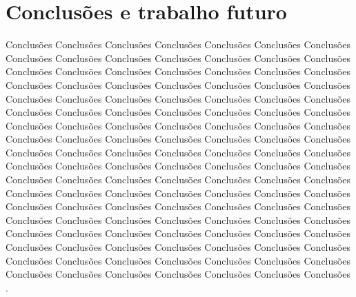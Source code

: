 \chapter{Conclusões e trabalho futuro}

Conclusões Conclusões Conclusões Conclusões Conclusões Conclusões
Conclusões
Conclusões Conclusões Conclusões Conclusões Conclusões Conclusões
Conclusões Conclusões Conclusões Conclusões Conclusões Conclusões
Conclusões Conclusões Conclusões Conclusões Conclusões Conclusões
Conclusões Conclusões Conclusões Conclusões Conclusões Conclusões
Conclusões Conclusões Conclusões Conclusões Conclusões Conclusões
Conclusões Conclusões Conclusões Conclusões Conclusões Conclusões
Conclusões Conclusões Conclusões Conclusões Conclusões Conclusões
Conclusões Conclusões Conclusões Conclusões Conclusões Conclusões
Conclusões Conclusões Conclusões Conclusões Conclusões Conclusões
Conclusões Conclusões Conclusões Conclusões Conclusões Conclusões
Conclusões Conclusões Conclusões Conclusões Conclusões Conclusões
Conclusões Conclusões Conclusões Conclusões Conclusões Conclusões
Conclusões Conclusões Conclusões Conclusões Conclusões Conclusões
Conclusões Conclusões Conclusões Conclusões Conclusões Conclusões
Conclusões Conclusões Conclusões Conclusões Conclusões Conclusões
Conclusões Conclusões Conclusões Conclusões Conclusões Conclusões
Conclusões Conclusões Conclusões Conclusões Conclusões Conclusões
Conclusões Conclusões Conclusões Conclusões Conclusões Conclusões
Conclusões Conclusões Conclusões Conclusões Conclusões Conclusões
Conclusões Conclusões Conclusões Conclusões Conclusões .



